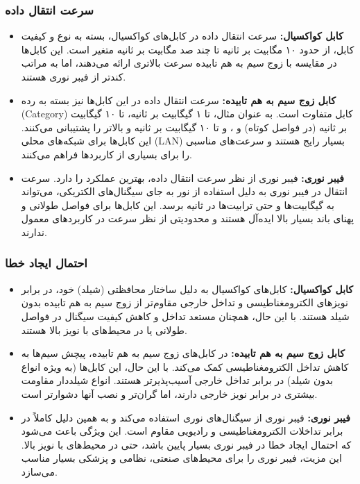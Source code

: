 

\subsubsection*{سرعت انتقال داده}

\begin{itemize}
	\item \textbf{کابل کواکسیال:} سرعت انتقال داده در کابل‌های کواکسیال، بسته به نوع و کیفیت کابل، از حدود ۱۰ مگابیت بر ثانیه تا چند صد مگابیت بر ثانیه متغیر است. این کابل‌ها در مقایسه با زوج سیم به هم تابیده سرعت بالاتری ارائه می‌دهند، اما به مراتب کندتر از فیبر نوری هستند.
	
	\item \textbf{کابل زوج سیم به هم تابیده:} سرعت انتقال داده در این کابل‌ها نیز بسته به رده (Category) کابل متفاوت است. به عنوان مثال،  تا ۱ گیگابیت بر ثانیه،  تا ۱۰ گیگابیت بر ثانیه (در فواصل کوتاه) و ،  و  تا ۱۰ گیگابیت بر ثانیه و بالاتر را پشتیبانی می‌کنند. این کابل‌ها برای شبکه‌های محلی (LAN) بسیار رایج هستند و سرعت‌های مناسبی را برای بسیاری از کاربردها فراهم می‌کنند.
	
	\item \textbf{فیبر نوری:} فیبر نوری از نظر سرعت انتقال داده، بهترین عملکرد را دارد. سرعت انتقال در فیبر نوری به دلیل استفاده از نور به جای سیگنال‌های الکتریکی، می‌تواند به گیگابیت‌ها و حتی ترابیت‌ها در ثانیه برسد. این کابل‌ها برای فواصل طولانی و پهنای باند بسیار بالا ایده‌آل هستند و محدودیتی از نظر سرعت در کاربردهای معمول ندارند.
\end{itemize}

\subsubsection*{احتمال ایجاد خطا}

\begin{itemize}
	\item \textbf{کابل کواکسیال:} کابل‌های کواکسیال به دلیل ساختار محافظتی (شیلد) خود، در برابر نویزهای الکترومغناطیسی و تداخل خارجی مقاوم‌تر از زوج سیم به هم تابیده بدون شیلد هستند. با این حال، همچنان مستعد تداخل و کاهش کیفیت سیگنال در فواصل طولانی یا در محیط‌های با نویز بالا هستند.
	
	\item \textbf{کابل زوج سیم به هم تابیده:} در کابل‌های زوج سیم به هم تابیده، پیچش سیم‌ها به کاهش تداخل الکترومغناطیسی کمک می‌کند. 
	با این حال، این کابل‌ها (به ویژه انواع بدون شیلد) در برابر تداخل خارجی آسیب‌پذیرتر هستند. انواع شیلددار مقاومت بیشتری در برابر نویز خارجی دارند، اما گران‌تر و نصب آنها دشوارتر است.
	
	\item \textbf{فیبر نوری:} فیبر نوری از سیگنال‌های نوری استفاده می‌کند و به همین دلیل کاملاً در برابر تداخلات الکترومغناطیسی و رادیویی مقاوم است. این ویژگی باعث می‌شود که احتمال ایجاد خطا در فیبر نوری بسیار پایین باشد، حتی در محیط‌های با نویز بالا. این مزیت، فیبر نوری را برای محیط‌های صنعتی، نظامی و پزشکی بسیار مناسب می‌سازد.
\end{itemize}

